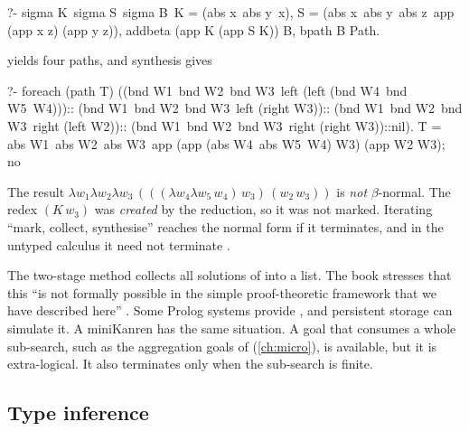 {{\begin{lprolog}
?- sigma K\ sigma S\ sigma B\
     K = (abs x\ abs y\ x),
     S = (abs x\ abs y\ abs z\ app (app x z) (app y z)),
     addbeta (app K (app S K)) B, bpath B Path.
\end{lprolog}
yields four paths, and synthesis gives
\begin{lprolog}
?- foreach (path T)
     ((bnd W1\ bnd W2\ bnd W3\ left (left (bnd W4\ bnd W5\ W4)))::
      (bnd W1\ bnd W2\ bnd W3\ left (right W3))::
      (bnd W1\ bnd W2\ bnd W3\ right (left W2))::
      (bnd W1\ bnd W2\ bnd W3\ right (right W3))::nil).
T = abs W1\ abs W2\ abs W3\
      app (app (abs W4\ abs W5\ W4) W3) (app W2 W3);
no
\end{lprolog}
The result $\lambda w_1\lambda w_2\lambda w_3\,(((\lambda w_4\lambda w_5\,w_4)\,w_3)\,(w_2\,w_3))$ is \emph{not}
$\beta$-normal. The redex $(K\,w_3)$ was \emph{created} by the reduction, so it was not marked. Iterating
\enquote{mark, collect, synthesise} reaches the normal form if it terminates, and in the untyped calculus it
need not terminate \book{190}.

\begin{pitfall}
The two-stage method collects all solutions of  into a list. The book stresses that this
\enquote{is not formally possible in the simple proof-theoretic framework that we have described here}
\book{190}. Some Prolog systems provide \lp{bagof}, and persistent storage can simulate it. A miniKanren has
the same situation. A goal that consumes a whole sub-search, such as the aggregation goals of \micro{}
(\cref{ch:micro}), is available, but it is extra-logical. It also terminates only when the sub-search is
finite.
\end{pitfall}

\subsection{Type inference}\label{sec:lambdatree-typeof}

}}
